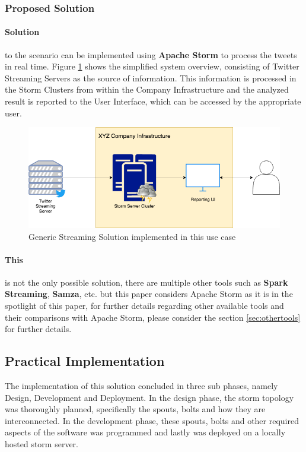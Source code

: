 \documentclass[runningheads,a4paper]{llncs}[2015/06/24]
\begin{document}
\subsubsection{Proposed Solution}

\paragraph{Solution} to the scenario can be implemented using \textbf{Apache Storm} to process the tweets in real time. Figure \ref{fig:solution} shows the simplified system overview, consisting of Twitter Streaming Servers as the source of information. This information is processed in the Storm Clusters from within the Company Infrastructure and the analyzed result is reported to the User Interface, which can be accessed by the appropriate user.

\begin{figure}
  \begin{center}
    \includegraphics[width=.7\textwidth]{solution.png}
    \caption{Generic Streaming Solution implemented in this use case}
    \label{fig:solution}
   \end{center}
\end{figure}

\paragraph{This} is not the only possible solution, there are multiple other tools such as \textbf{Spark Streaming}, \textbf{Samza}, etc. but this paper considers Apache Storm as it is in the spotlight of this paper, for further details regarding other available tools and their comparisons with Apache Storm, please consider the section \ref{sec:othertools} for further details.

\subsection{Practical Implementation}
The implementation of this solution concluded in three sub phases, namely Design, Development and Deployment. In the design phase, the storm topology was thoroughly planned, specifically the spouts, bolts and how they are interconnected. In the development phase, these spouts, bolts and other required aspects of the software was programmed and lastly was deployed on a locally hosted storm server.
\end{document}
